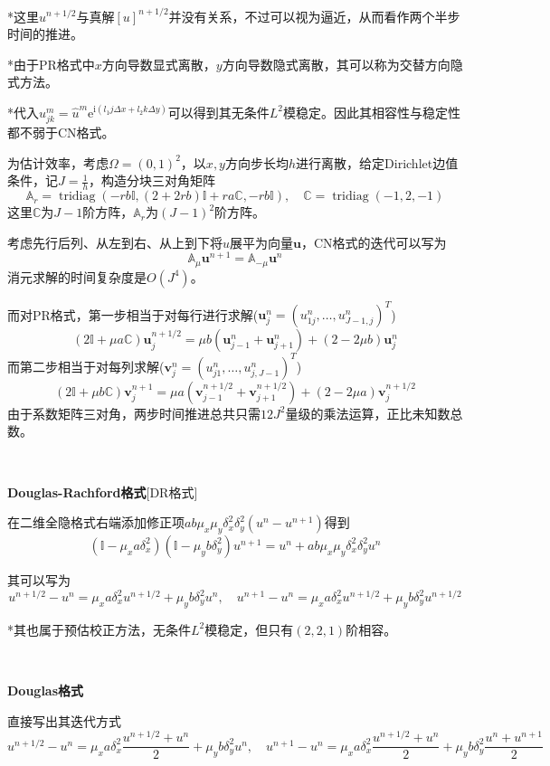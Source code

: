 \documentclass[a4paper,UTF8,fontset=windows]{ctexart}
\newcommand*{\bu}{\mathbf{u}}
\DeclareMathOperator{\tridiag}{tridiag}
\begin{document}
*这里$u^{n+1/2}$与真解$[u]^{n+1/2}$并没有关系，不过可以视为逼近，从而看作两个半步时间的推进。

*由于PR格式中$x$方向导数显式离散，$y$方向导数隐式离散，其可以称为交替方向隐式方法。

*代入$u_{jk}^m=\hat{u}^m\mathrm{e}^{\mathrm{i}(l_1j\Delta x+l_2k\Delta y)}$可以得到其无条件$L^2$模稳定。因此其相容性与稳定性都不弱于CN格式。

为估计效率，考虑$\Omega=(0,1)^2$，以$x,y$方向步长均$h$进行离散，给定Dirichlet边值条件，记$J=\frac{1}{h}$，构造分块三对角矩阵
$$\mathbb{A}_r=\tridiag(-rb\mathbb{I},(2+2rb)\mathbb{I}+ra\mathbb{C},-rb\mathbb{I}),\quad\mathbb{C}=\tridiag(-1,2,-1)$$
这里$\mathbb{C}$为$J-1$阶方阵，$\mathbb{A}_r$为$(J-1)^2$阶方阵。

考虑先行后列、从左到右、从上到下将$u$展平为向量$\bu$，CN格式的迭代可以写为
$$\mathbb{A}_\mu\bu^{n+1}=\mathbb{A}_{-\mu}\bu^n$$
消元求解的时间复杂度是$O(J^4)$。

而对PR格式，第一步相当于对每行进行求解($\bu_j^n=(u_{1j}^n,\dots,u_{J-1,j}^n)^T$)
$$(2\mathbb{I}+\mu a\mathbb{C})\bu_j^{n+1/2}=\mu b(\bu_{j-1}^n+\bu_{j+1}^n)+(2-2\mu b)\bu_j^n$$
而第二步相当于对每列求解($\mathbf{v}_j^n=(u_{j1}^n,\dots,u_{j,J-1}^n)^T$)
$$(2\mathbb{I}+\mu b\mathbb{C})\mathbf{v}_j^{n+1}=\mu a(\mathbf{v}_{j-1}^{n+1/2}+\mathbf{v}_{j+1}^{n+1/2})+(2-2\mu a)\mathbf{v}_j^{n+1/2}$$
由于系数矩阵三对角，两步时间推进总共只需$12J^2$量级的乘法运算，正比未知数总数。

\

\textbf{Douglas-Rachford格式}[DR格式]

在二维全隐格式右端添加修正项$ab\mu_x\mu_y\delta_x^2\delta_y^2(u^n-u^{n+1})$得到
$$(\mathbb{I}-\mu_xa\delta_x^2)(\mathbb{I}-\mu_yb\delta_y^2)u^{n+1}=u^n+ab\mu_x\mu_y\delta_x^2\delta_y^2u^n$$

其可以写为
$$u^{n+1/2}-u^n=\mu_xa\delta_x^2u^{n+1/2}+\mu_yb\delta_y^2u^n,\quad u^{n+1}-u^n=\mu_xa\delta_x^2u^{n+1/2}+\mu_yb\delta_y^2u^{n+1/2}$$

*其也属于预估校正方法，无条件$L^2$模稳定，但只有$(2,2,1)$阶相容。

\

\textbf{Douglas格式}

直接写出其迭代方式
$$u^{n+1/2}-u^n=\mu_xa\delta_x^2\frac{u^{n+1/2}+u^n}{2}+\mu_yb\delta_y^2u^n,\quad u^{n+1}-u^n=\mu_xa\delta_x^2\frac{u^{n+1/2}+u^n}{2}+\mu_yb\delta_y^2\frac{u^n+u^{n+1}}{2}$$
\end{document}
